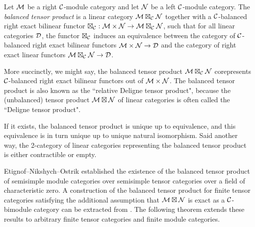 \documentclass{amsart}
\begin{document}
\begin{definition}
	Let $\mathcal M$ be a right $\mathcal C$-module category and let $\mathcal N$ be a left $\mathcal C$-module category. The {\em balanced tensor product} is a linear category $\mathcal M \boxtimes_{\mathcal C} \mathcal N$
	 together with a $\mathcal C$-balanced right exact bilinear functor $\boxtimes_{\mathcal C} : \mathcal M \times \mathcal N \to \mathcal M \boxtimes_{\mathcal C} \mathcal N$, such that for all linear categories $\mathcal D$, the functor $\boxtimes_{\mathcal C}$ induces an equivalence between the category of $\mathcal C$-balanced right exact bilinear functors $\mathcal M \times \mathcal N \to \mathcal D$ and the category of right exact linear functors $\mathcal M \boxtimes_{\mathcal C} \mathcal N \to \mathcal D$. 
\end{definition}
\nid More succinctly, we might say, the balanced tensor product $\mathcal M \boxtimes_{\mathcal C} \mathcal N$ corepresents $\mathcal C$-balanced right exact bilinear functors out of $\mathcal M \times \mathcal N$.  The balanced tensor product is also known as the ``relative Deligne tensor product", because the (unbalanced) tensor product $\mathcal M \boxtimes \mathcal N$ of linear categories is often called the ``Deligne tensor product".  

If it exists, the balanced tensor product is unique up to equivalence, and this equivalence is in turn unique up to unique natural isomorphism. Said another way, the 2-category of linear categories representing the balanced tensor product is either contractible or empty. 

Etignof--Nikshych--Ostrik \cite{0909.3140} established the existence of the balanced tensor product of semisimple module categories over semisimple tensor categories over a field of characteristic zero.  A construction of the balanced tensor product for finite tensor categories satisfying the additional assumption that $\mathcal M \boxtimes \mathcal N$ is exact as a $\mathcal C$-bimodule category can be extracted from \cite[Thm 3.1]{1102.3411}.   
 The following theorem extends these results to arbitrary finite tensor categories and finite module categories. 
\end{document}
